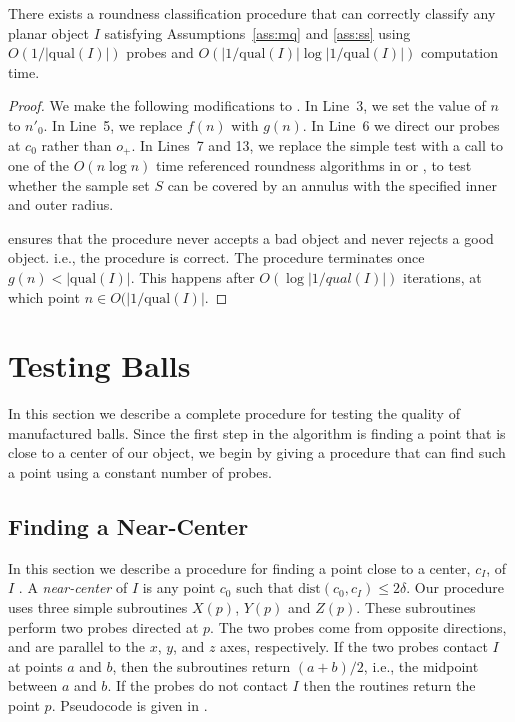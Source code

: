 \documentclass[11pt]{article}
\newcommand{\origin}{o_+}
\newcommand{\dist}{\mathrm{dist}}
\newcommand{\qual}{\mathrm{qual}}
\begin{document}
\begin{thm}
There exists a roundness classification procedure that can correctly
classify any planar object $I$ satisfying Assumptions~\ref{ass:mq} and
\ref{ass:ss} using $O(1/|\qual(I)|)$ probes and 
$O(|1/\qual(I)|\log|1/\qual(I)|)$ computation time.
\end{thm}

\begin{proof}
We make the following modifications to .  In
Line~3, we set the value of $n$ to $n'_0$.  In Line~5, we replace
$f(n)$ with $g(n)$.  In Line~6 we direct our probes at $c_0$ rather
than $\origin$.  In Lines~7 and 13, we replace the simple test with a
call to one of the $O(n\log n)$ time referenced roundness algorithms
in \cite{bbbrw98} or \cite{dgr97}, to test whether the sample set $S$
can be covered by an annulus with the specified inner and outer
radius.

 ensures that the procedure never accepts a
bad object and never rejects a good object. i.e., the procedure is
correct.  The procedure terminates once $g(n)<|\qual(I)|$.  This
happens after $O(\log|1/qual(I)|)$ iterations, at which point $n\in
O(|1/\qual(I)|$. 
\end{proof}

\section{Testing Balls}

In this section we describe a complete procedure for testing the
quality of manufactured balls.  Since the first step in the algorithm
is finding a point that is close to a center of our object, we begin
by giving a procedure that can find such a point using a constant
number of probes.

\subsection{Finding a Near-Center}

In this section we describe a procedure for finding a point close to
a center, $c_I$, of $I$ .  A \emph{near-center} of $I$ is any point
$c_0$ such that $\dist(c_0,c_I)\le 2\delta$.  Our procedure uses three
simple subroutines $X(p)$, $Y(p)$ and $Z(p)$.  These subroutines
perform two probes directed at $p$.  The two probes come from opposite
directions, and are parallel to the $x$, $y$, and $z$ axes,
respectively.  If the two probes contact $I$ at points $a$ and $b$,
then the subroutines return $(a+b)/2$, i.e., the midpoint between $a$
and $b$.  If the probes do not contact $I$ then the routines return
the point $p$.  Pseudocode is given in .
\end{document}
